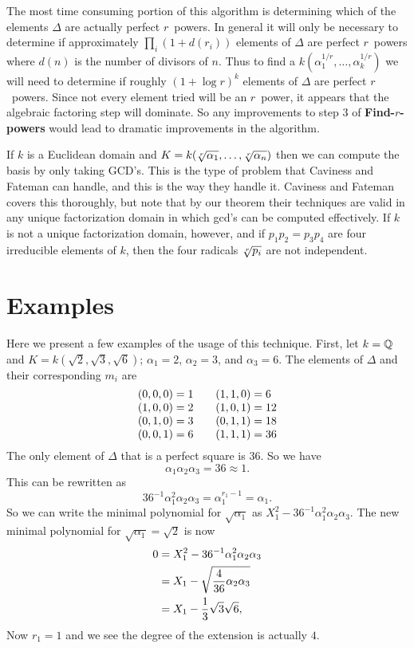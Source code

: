 \medskip
The most time consuming portion of this algorithm is determining
which of the elements $\Delta$ are actually perfect $r$\th\ powers.  
In general it will only be necessary to determine if
approximately $\prod_i(1 + d(r_i))$ elements of $\Delta$ are perfect
$r$\th\ powers where $d(n)$ is the number of divisors of $n$.
Thus to find a $k(\alpha_1^{1/r}, \ldots, \alpha_k^{1/r})$
we will need to determine if roughly $(1 + \log r)^k$ elements of
$\Delta$ are perfect $r$\th\ powers.  Since not every element tried will
be an $r$\th\ power, it appears that the algebraic factoring step will 
dominate.  So any improvements to step 3 of {\bf Find-$r$\th-powers} would
lead to dramatic improvements in the algorithm.  

If $k$ is a Euclidean domain and 
$K = k(\root r \of {\alpha_1}, \ldots, \root r \of {\alpha_n})$
then we can compute the basis by only taking GCD's.
This is the type of problem that Caviness and Fateman can handle, and this
is the way they handle it.  Caviness and Fateman
\cite{Caviness1976-uc} covers this thoroughly, but note that by our
theorem their techniques are valid in any unique factorization domain
in which gcd's can be computed effectively.  If $k$ is not a unique
factorization domain, however, and if $p_1 p_2 = p_3 p_4$ are four
irreducible elements of $k$, then the four radicals $\root r \of
{p_i}$ are not independent. 

\section{Examples}
\label{Kummer:Example:Sec}

Here we present a few examples of the usage of this technique.  First,
let $k = \mathbb{Q}$ and $K = k(\sqrt{2}, \sqrt{3}, \sqrt{6})$; $\alpha_1=2$, 
$\alpha_2=3$, and  $\alpha_3=6$.  The elements of $\Delta$ and their
corresponding $m_i$ are  
\[
\vcenter{\halign{\hfil$(#)$&$\null = #$\hfil\qquad&\hfil$(#)$&$\null =
#$\hfil\cr
0,0,0& 1&1,1,0& 6\cr 
1,0,0& 2&1,0,1& 12\cr
0,1,0& 3&0,1,1& 18\cr
0,0,1& 6&1,1,1&36\cr}}
\]
The only element of $\Delta$ that is a perfect square is $36$.  So we
have
\[
\alpha_1 \alpha_2 \alpha_3 = 36 \approx 1.
\]
This can be rewritten as 
\[
36^{-1} \alpha_1^2 \alpha_2 \alpha_3 = \alpha_1^{r_1 -1} = \alpha_1.
\]
So we can write the minimal polynomial for $\sqrt{\alpha_1}$ as
$X_1^2 - 36^{-1} \alpha_1^2 \alpha_2 \alpha_3$.  
The new minimal polynomial for $\sqrt{\alpha_1}= \sqrt{2}$ is now 
\[
\begin{aligned}
0 &= X_1^2 - 36^{-1} \alpha_1^2 \alpha_2 \alpha_3\\
& = X_1 - \sqrt{{4 \over 36} \alpha_2 \alpha_3}\\
& =X_1 - {1 \over 3} \sqrt{3} \sqrt{6},
\end{aligned}
\]
Now $r_1 = 1$ and we see the degree of the extension is actually $4$.

